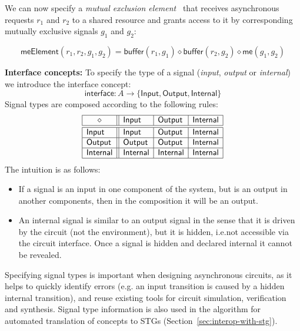 \documentclass[british, journal]{IEEEtran}
\begin{document}
We can now specify a \emph{mutual exclusion
element}~\cite{2008_kinniment_synchronisation}
that receives asynchronous requests $r_{1}$ and $r_{2}$ to a shared
resource and grants access to it by corresponding mutually exclusive
signals $g_{1}$ and $g_{2}$:

\vspace{-3mm}
{\small
\[
\mathsf{meElement}(r_{1}, r_{2}, g_{1}, g_{2})\!=\!\mathsf{buffer}(r_{1}, g_{1})
\diamond \mathsf{buffer}(r_{2}, g_{2}) \diamond \mathsf{me}(g_{1}, g_{2})
\]}
\vspace{-3mm}

\textbf{Interface concepts:} To specify the type of a signal (\emph{input},
\emph{output} or \emph{internal}) we introduce the \textsf{interface} concept:
\[
\mathsf{interface} : A \rightarrow \{\mathsf{Input}, \mathsf{Output},
\mathsf{Internal}\}
\]
Signal types are composed according to the following rules:
\[
\begin{array}{|l||l|l|l|}
\hline
\multicolumn{1}{|c||}{\diamond} & \mathsf{Input} & \mathsf{Output} &
\mathsf{Internal} \\ \hline \hline
\mathsf{Input} & \mathsf{Input} & \mathsf{Output} & \mathsf{Internal} \\ \hline
\mathsf{Output} & \mathsf{Output} & \mathsf{Output} & \mathsf{Internal} \\
\hline
\mathsf{Internal}& \mathsf{Internal} & \mathsf{Internal} & \mathsf{Internal} \\
\hline
\end{array}
\]
The intuition is as follows:
\begin{itemize}
    \item If a signal is an input in one component of the system, but is an
    output in another components, then in the composition it will be an output.
    \item An internal signal is similar to an output signal in the sense
that it is driven by the circuit (not the environment), but it is hidden, i.e.not accessible via the circuit interface. Once a signal is hidden and declared    internal it cannot be revealed.
\end{itemize}

\noindent Specifying signal types is important when designing asynchronous
circuits, as it helps to quickly identify errors (e.g. an input transition is
caused by a hidden internal transition), and reuse existing tools for circuit
simulation, verification and synthesis. Signal type information is also used
in the algorithm for automated translation of concepts to
STGs (Section~\ref{sec:interop-with-stg}).
\end{document}
